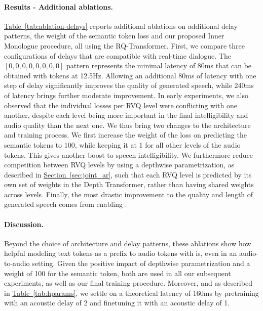 \paragraph{Results - Additional ablations.} \hyperref[tab:ablation-delays]{Table~\ref{tab:ablation-delays}} reports additional ablations on additional delay patterns, the weight of the semantic token loss and our proposed Inner Monologue procedure, all using the RQ-Transformer. 
First, we compare three configurations of delays that are compatible with real-time dialogue. The $[0, 0, 0, 0, 0, 0, 0, 0]$ pattern represents the minimal latency of 80ms that can be obtained with \mimi{} tokens at 12.5Hz. Allowing an additional 80ms of latency with one step of delay significantly improves the quality of generated speech, while 240ms of latency brings further moderate improvement. 
In early experiments, we also observed that the individual losses per RVQ level were conflicting with one another, despite each level being more important in the final intelligibility and audio quality than the next one. We thus bring two changes to the architecture and training process. We first increase the weight of the loss on predicting the semantic tokens to 100, while keeping it at 1 for all other levels of the audio tokens. 
This gives another boost to speech intelligibility. We furthermore reduce competition between RVQ levels by using a depthwise parametrization, as described in \hyperref[sec:joint_ar]{Section~\ref{sec:joint_ar}}, such that each RVQ level is predicted by its own set of weights in the Depth Transformer, rather than having shared weights across levels.
Finally, the most drastic improvement to the quality and length of generated speech comes from enabling \interleaving{}.

\paragraph{Discussion.} Beyond the choice of architecture and delay patterns, these ablations show how helpful modeling text tokens as a prefix to audio tokens with \interleaving{} is, even in an audio-to-audio setting. Given the positive impact of depthwise parametrization and a weight of 100 for the semantic token, both are used in all our subsequent experiments, as well as our final training procedure. Moreover, and as described in \hyperref[tab:hparams]{Table~\ref{tab:hparams}}, we settle on a theoretical latency of 160ms by pretraining \ours{} with an acoustic delay of 2 and finetuning it with an acoustic delay of 1.

